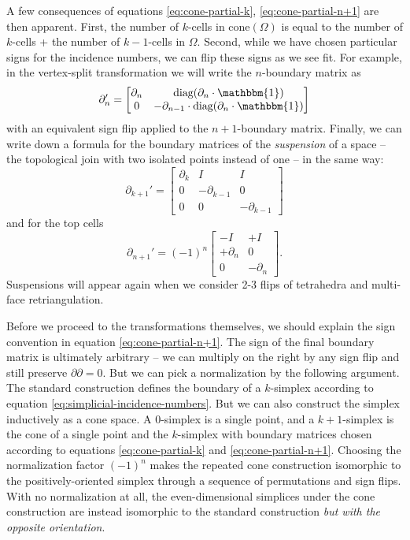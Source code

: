 \documentclass[twocolumn]{article}
\begin{document}
A few consequences of equations \eqref{eq:cone-partial-k}, \eqref{eq:cone-partial-n+1} are then apparent.
First, the number of $k$-cells in $\text{cone}(\Omega)$ is equal to the number of $k$-cells + the number of $k - 1$-cells in $\Omega$.
Second, while we have chosen particular signs for the incidence numbers, we can flip these signs as we see fit.
For example, in the vertex-split transformation we will write the $n$-boundary matrix as
\begin{equation}
    \partial_n' = \left[\begin{matrix}\partial_n & \text{diag}(\partial_n\cdot\mathbbm{1}) \\ 0 & -\partial_{n - 1}\cdot\text{diag}(\partial_n\cdot\mathbbm{1})\end{matrix}\right]
\end{equation}
with an equivalent sign flip applied to the $n + 1$-boundary matrix.
Finally, we can write down a formula for the boundary matrices of the \emph{suspension} of a space -- the topological join with two isolated points instead of one -- in the same way:
\begin{equation}
    \partial_{k + 1}' = \left[\begin{matrix}\partial_k & I & I \\ 0 & -\partial_{k - 1} & 0 \\ 0 & 0 & -\partial_{k - 1}\end{matrix}\right]
    \label{eq:suspension-partial-k}
\end{equation}
and for the top cells
\begin{equation}
    \partial_{n + 1}' = (-1)^n\left[\begin{matrix}-I & +I \\ +\partial_n & 0 \\ 0 & -\partial_n\end{matrix}\right].
    \label{eq:suspension-partial-n+1}
\end{equation}
Suspensions will appear again when we consider 2-3 flips of tetrahedra and multi-face retriangulation.

Before we proceed to the transformations themselves, we should explain the sign convention in equation \eqref{eq:cone-partial-n+1}.
The sign of the final boundary matrix is ultimately arbitrary -- we can multiply on the right by any sign flip and still preserve $\partial\partial = 0$.
But we can pick a normalization by the following argument.
The standard construction defines the boundary of a $k$-simplex according to equation \eqref{eq:simplicial-incidence-numbers}.
But we can also construct the simplex inductively as a cone space.
A 0-simplex is a single point, and a $k + 1$-simplex is the cone of a single point and the $k$-simplex with boundary matrices chosen according to equations \eqref{eq:cone-partial-k} and \eqref{eq:cone-partial-n+1}.
Choosing the normalization factor $(-1)^n$ makes the repeated cone construction isomorphic to the positively-oriented simplex through a sequence of permutations and sign flips.
With no normalization at all, the even-dimensional simplices under the cone construction are instead isomorphic to the standard construction \emph{but with the opposite orientation}.
\end{document}
